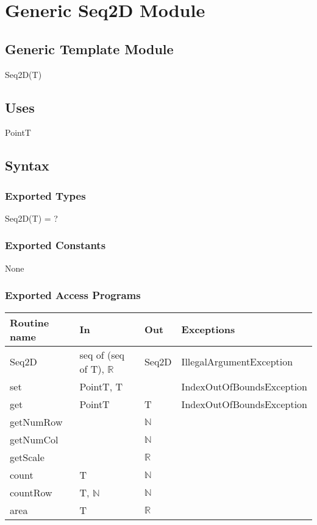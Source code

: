 \documentclass[12pt]{article}
\begin{document}
\newpage

\section* {Generic Seq2D Module}

\subsection* {Generic Template Module}

Seq2D(T)

\subsection* {Uses}

PointT

\subsection* {Syntax}

\subsubsection* {Exported Types}

Seq2D(T) = ?

\subsubsection* {Exported Constants}

None

\subsubsection* {Exported Access Programs}

\begin{tabular}{| l | l | l | p{6cm} |}
\hline
\textbf{Routine name} & \textbf{In} & \textbf{Out} & \textbf{Exceptions}\\
\hline
Seq2D & seq of (seq of T), $\mathbb{R}$ & Seq2D & IllegalArgumentException\\
\hline
set & PointT, T & ~ & IndexOutOfBoundsException\\
\hline
get & PointT & T & IndexOutOfBoundsException\\
\hline
getNumRow & ~ & $\mathbb{N}$ & \\
\hline
getNumCol & ~ & $\mathbb{N}$ & \\
\hline
getScale & ~ & $\mathbb{R}$ & \\
\hline
count & T & $\mathbb{N}$ & \\
\hline
countRow & T, $\mathbb{N}$ & $\mathbb{N}$ & \\
\hline
area & T & $\mathbb{R}$ & \\
\hline
\end{tabular}
\end{document}
